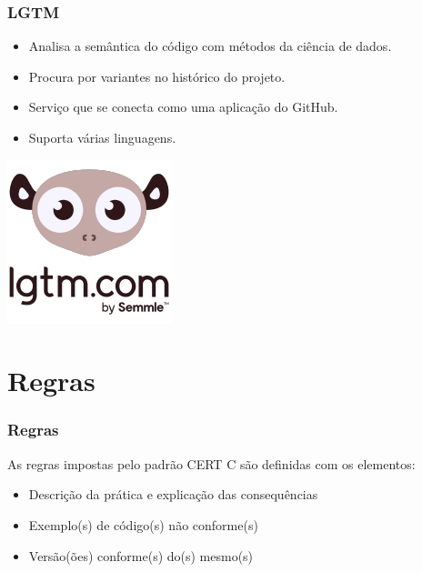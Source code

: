 \documentclass{beamer}
\begin{document}
\begin{frame}
  \frametitle{LGTM}

  \begin{minipage}{0.5\textwidth}\centering
    \begin{itemize}
      \item Analisa a semântica do código com métodos da ciência de dados.
      \item Procura por variantes no histórico do projeto.
      \item Serviço que se conecta como uma aplicação do GitHub.
      \item Suporta várias linguagens.
    \end{itemize}
  \end{minipage}
  \hfill
  \begin{minipage}{0.4\textwidth}\raggedleft

  \includegraphics[scale=0.6]{img/lgtm.png}

  \end{minipage}

\end{frame}

\section{Regras}

\begin{frame}
  \frametitle{Regras}

  As regras impostas pelo padrão CERT C são definidas com os elementos:
  \begin{itemize}
    \item Descrição da prática e explicação das consequências
    \item Exemplo(s) de código(s) não conforme(s)
    \item Versão(ões) conforme(s) do(s) mesmo(s)
  \end{itemize}

\end{frame}
\end{document}
